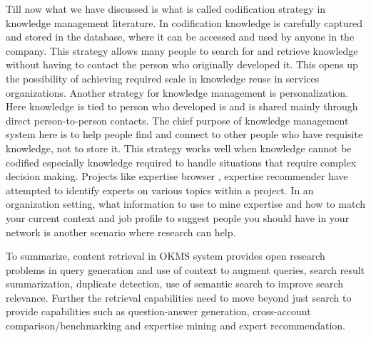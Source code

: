 Till now what we have discussed is what is called codification strategy \cite{} in knowledge management literature. In codification knowledge is carefully captured and stored in the database, where it can be accessed and used by anyone in the company. This strategy allows many people to search for and retrieve knowledge without having to contact the person who originally developed it. This opens up the possibility of achieving required scale in knowledge reuse in services organizations. Another strategy for knowledge management is personalization. Here knowledge is  tied to person who developed is and is shared mainly through direct person-to-person contacts. The chief purpose of knowledge management system here is to help people find and connect to other people who have requisite knowledge, not to store it. This strategy works well when knowledge cannot be codified especially knowledge required to handle situations that require complex decision making. Projects like expertise browser \cite{}, expertise recommender \cite{} have attempted to identify experts on various topics within a project. In an organization setting, what information to use to mine expertise and how to match your current context and job profile to suggest people you should have in your network is another scenario where research can help. 

To summarize, content retrieval in OKMS system provides open research problems in query generation and use of context to augment queries, search result summarization, duplicate detection, use of semantic search to improve search relevance. Further the retrieval capabilities need to move beyond just search to provide capabilities such as question-answer generation, cross-account comparison/benchmarking and expertise mining and expert recommendation.

